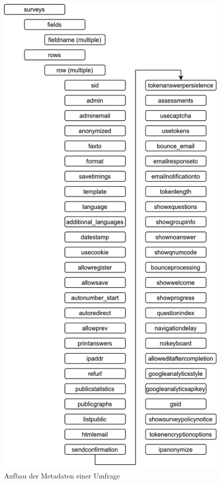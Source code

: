 \begin{figure}[h]
	\centering
	\includegraphics[width=.7\textwidth]{./img/append_lss_sur.png}
	\caption{Aufbau der Metadaten einer Umfrage}
\end{figure}

